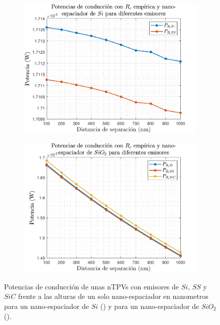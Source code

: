 \begin{figure} [H]%
	\centering
	\begin{subfigure}[b]{0.48\textwidth}%
			\includegraphics[width=\columnwidth]{Prc_XxSiGe}%
			\caption{}%
			\label{fig:prc_xxSi}%
	\end{subfigure}
	\hfill
	\begin{subfigure}[b]{0.48\textwidth}%
			\includegraphics[width=\columnwidth]{Prc_XxSiO2Ge}%
			\caption{}%
			\label{fig:prc_xxSiO2}%
	\end{subfigure}
	\caption{Potencias de conducción de unas nTPVs con emisores de $Si$, $SS$ y $SiC$ frente a las alturas de un solo nano-espaciador en nanometros para un nano-espaciador de $Si$ () y para un nano-espaciador de $SiO_2$ ().}%
	\label{fig:prc_xxXX}%
\end{figure}
